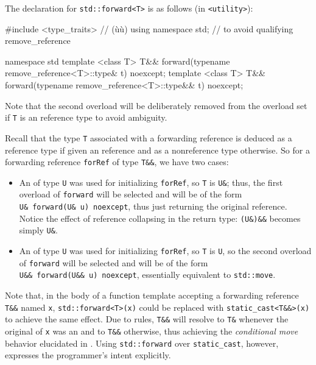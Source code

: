 The declaration for \lstinline!std::forward<T>! is as follows (in
\lstinline!<utility>!):

\begin{emcppshiddenlisting}[emcppsbatch=e7]
#include <type_traits>  // (ù{}ù)
using namespace std; // to avoid qualifying remove_reference
\end{emcppshiddenlisting}
\begin{emcppslisting}[emcppsbatch=e7]
namespace std {
template <class T> T&& forward(typename remove_reference<T>::type&  t) noexcept;
template <class T> T&& forward(typename remove_reference<T>::type&& t) noexcept;
}
\end{emcppslisting}

\noindent Note that the second overload will be deliberately removed from the overload set if \lstinline!T! is an  reference type to avoid ambiguity.


Recall that the type \lstinline!T! associated with a forwarding reference
is deduced as a reference type if given an  reference and
as a nonreference type otherwise. So for a forwarding reference
\lstinline!forRef! of type \lstinline!T&&!, we have two cases:
\begin{itemize}
\item{An  of type \lstinline!U! was used for initializing \lstinline!forRef!, so \lstinline!T! is \lstinline!U&!; thus, the first overload of \lstinline!forward! will be selected and will be of the form \lstinline!U&!~\lstinline!forward(U&!~\lstinline!u)!~\lstinline!noexcept!, thus just returning the original  reference. Notice the effect of reference collapsing in the return type: \lstinline!(U&)&&! becomes simply \lstinline!U&!.}
\item{An  of type \lstinline!U! was used for initializing \lstinline!forRef!, so \lstinline!T! is \lstinline!U!, so the second overload of \lstinline!forward! will be selected and will be of the form \lstinline!U&&!~\lstinline!forward(U&&!~\lstinline!u)!~\lstinline!noexcept!, essentially equivalent to \lstinline!std::move!.}
\end{itemize}
Note that, in the body of a function template accepting a forwarding
reference \lstinline!T&&! named \lstinline!x!, \lstinline!std::forward<T>(x)!
could be replaced with \lstinline!static_cast<T&&>(x)! to achieve the
same effect. Due to  rules, \lstinline!T&&!
will resolve to \lstinline!T&! whenever the original  of \lstinline!x! was an  and to \lstinline!T&&!
otherwise, thus achieving the \emph{conditional move} behavior
elucidated in .
Using \lstinline!std::forward! over \lstinline!static_cast!, however, expresses the programmer's intent explicitly.


